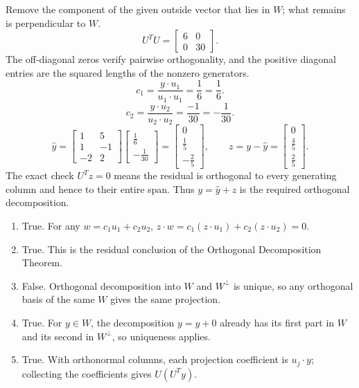 \idea Remove the component of the given outside vector that lies in $W$; what remains is perpendicular to $W$.
\[U^TU=\left[\begin{array}{rr}6&0\\0&30\end{array}\right].\]
The off-diagonal zeros verify pairwise orthogonality, and the positive diagonal entries are the squared lengths of the nonzero generators.
\[c_{1}=\frac{y\cdot u_{1}}{u_{1}\cdot u_{1}}=\frac{1}{6}=\frac{1}{6}.\]
\[c_{2}=\frac{y\cdot u_{2}}{u_{2}\cdot u_{2}}=\frac{-1}{30}=- \frac{1}{30}.\]
\[\widehat y=\left[\begin{array}{rr}1&5\\1&-1\\-2&2\end{array}\right]\left[\begin{array}{r}\frac{1}{6}\\- \frac{1}{30}\end{array}\right]=\left[\begin{array}{r}0\\\frac{1}{5}\\- \frac{2}{5}\end{array}\right],\qquad z=y-\widehat y=\left[\begin{array}{r}0\\\frac{4}{5}\\\frac{2}{5}\end{array}\right].\]
The exact check $U^Tz=0$ means the residual is orthogonal to every generating column and hence to their entire span. Thus $y=\widehat y+z$ is the required orthogonal decomposition.

\begin{enumerate}[label=(\alph*)]
\item True. For any $w=c_1u_1+c_2u_2$,
$z\cdot w=c_1(z\cdot u_1)+c_2(z\cdot u_2)=0$.
\item True. This is the residual conclusion of the Orthogonal
Decomposition Theorem.
\item False. Orthogonal decomposition into $W$ and $W^\perp$ is
unique, so any orthogonal basis of the same $W$ gives the same projection.
\item True. For $y\in W$, the decomposition $y=y+0$ already has
its first part in $W$ and its second in $W^\perp$, so uniqueness applies.
\item True. With orthonormal columns, each projection coefficient is
$u_j\cdot y$; collecting the coefficients gives $U(U^Ty)$.
\end{enumerate}

